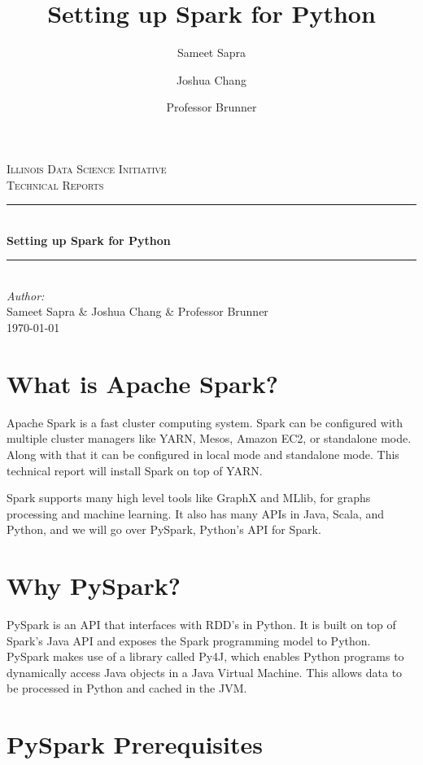 \documentclass[9pt,twocolumn,twoside]{idsi}
\author[1]{Sameet Sapra}
\author[2]{Joshua Chang}
\author[3]{Professor Brunner}
\affil[1]{National Center For Supercomputing Applications (NCSA)}
\affil[2]{Laboratory for Computation, Data, and Machine Learning}
\affil[3]{Illinois Data Science Initiative}
\title{Setting up Spark for Python}
\newcommand{\HRule}{\rule{\linewidth}{0.5mm}}
\begin{document}
\begin{titlepage}
\center 
\textsc{\LARGE Illinois Data Science Initiative}\\[1.5cm] 
\textsc{\Large Technical Reports}\\[0.5cm] \HRule \\[0.4cm]
{\huge \bfseries Setting up Spark for Python } \\[0.4cm] \HRule \\[1.5cm]
\Large \emph{Author:}\\ Sameet Sapra \& Joshua Chang \& Professor Brunner\\[3cm]
{\large \today}\\[3cm] %
\vfill
\end{titlepage}
%

\maketitle

\section{What is Apache Spark?}

Apache Spark is a fast cluster computing system. Spark can be configured with multiple cluster managers like YARN, Mesos, Amazon EC2, or standalone mode. Along with that it can be configured in local mode and standalone mode. This technical report will install Spark on top of YARN.

Spark supports many high level tools like GraphX and MLlib, for graphs processing and machine learning. It also has many APIs in Java, Scala, and Python, and we will go over PySpark, Python's API for Spark.

\section{Why PySpark?}

PySpark is an API that interfaces with RDD's in Python. It is built on top of Spark's Java API and exposes the Spark programming model to Python. PySpark makes use of a library called Py4J, which enables Python programs to dynamically access Java objects in a Java Virtual Machine. This allows data to be processed in Python and cached in the JVM.

\section{PySpark Prerequisites}
\end{document}
